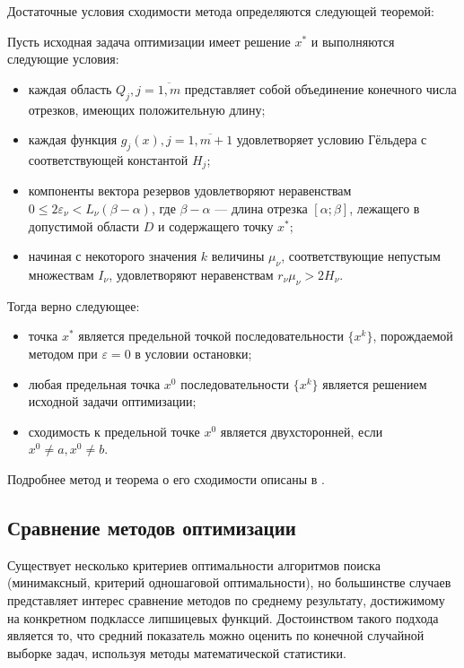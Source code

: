 Достаточные условия сходимости метода определяются следующей теоремой:
\begin{theorem}
  Пусть исходная задача оптимизации имеет решение \(x^{*}\) и выполняются следующие условия:
  \begin{itemize}
    \item каждая область \(Q_{j},j={\overline {1,m}}\) представляет собой объединение
    конечного числа отрезков, имеющих положительную длину;
    \item каждая функция \(g_{j}(x),j={\overline {1,m+1}}\) удовлетворяет условию Гёльдера с соответствующей константой \(H_{j}\);
    \item компоненты вектора резервов удовлетворяют неравенствам \(0\leq 2\varepsilon _{\nu }<L_{\nu }(\beta -\alpha )\),
    где \(\beta -\alpha\) --- длина отрезка \([\alpha ;\beta ]\), лежащего в допустимой области \(D\) и содержащего точку \(x^{*}\);
    \item начиная с некоторого значения \(k\) величины \(\mu _{\nu }\), соответствующие
    непустым множествам \(I_{\nu }\), удовлетворяют неравенствам \(r_{\nu }\mu _{\nu }>2H_{\nu }\).
  \end{itemize}
  Тогда верно следующее:
  \begin{itemize}
    \item точка \(x^{*}\) является предельной точкой последовательности \(\{x^{k}\}\), порождаемой методом при \(\varepsilon =0\)  в условии остановки;
    \item любая предельная точка \(x^{0}\)  последовательности \(\{x^{k}\}\) является решением исходной задачи оптимизации;
    \item сходимость к предельной точке \(x^{0}\) является двухсторонней, если \(x^{0}\not =a,x^{0}\not =b\).
  \end{itemize}
\end{theorem}

Подробнее метод и теорема о его сходимости описаны в \cite{strongSerg}.

\subsection{Сравнение методов оптимизации} \label{subsec:methods_compasion}
Существует несколько критериев оптимальности алгоритмов поиска (минимаксный, критерий
одношаговой оптимальности), но большинстве случаев представляет интерес
сравнение методов по среднему результату, достижимому на конкретном подклассе липшицевых функций.
Достоинством такого подхода является то, что средний показатель можно оценить
по конечной случайной выборке задач, используя методы математической статистики.


